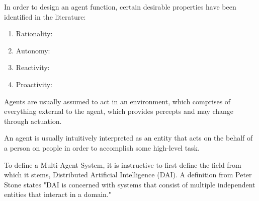 In order to design an agent function, certain desirable properties have been identified in the literature:
\begin{enumerate}
    \item Rationality: 
    \item Autonomy: 
    \item Reactivity: 
    \item Proactivity: 
\end{enumerate}


Agents are usually assumed to act in an environment, which comprises of everything external to the agent, which provides percepts and may change through actuation.

An agent is usually intuitively interpreted as an entity that acts on the behalf of a person on people in order to accomplish some high-level task.\par


To define a Multi-Agent System, it is instructive to first define the field from which it stems, Distributed Artificial Intelligence (DAI). A definition from Peter Stone states "DAI is concerned with systems that consist of multiple independent entities that interact in a domain."\cite{Stone2000MultiagentPerspective}
